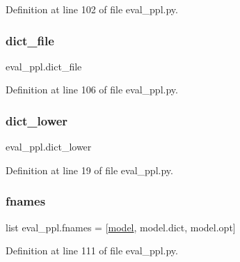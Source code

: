Definition at line 102 of file eval\+\_\+ppl.\+py.

\mbox{\label{namespaceeval__ppl_ae70a1e5d29d1562380de01b52412a9fa}} 
\subsubsection{\texorpdfstring{dict\+\_\+file}{dict\_file}}
{\footnotesize\ttfamily eval\+\_\+ppl.\+dict\+\_\+file}



Definition at line 106 of file eval\+\_\+ppl.\+py.

\mbox{\label{namespaceeval__ppl_a3c7de5b6434cc85b28eafa791111e6ae}} 
\subsubsection{\texorpdfstring{dict\+\_\+lower}{dict\_lower}}
{\footnotesize\ttfamily eval\+\_\+ppl.\+dict\+\_\+lower}



Definition at line 19 of file eval\+\_\+ppl.\+py.

\mbox{\label{namespaceeval__ppl_a21d7ad87820a8ba4905fffcc224a3395}} 
\subsubsection{\texorpdfstring{fnames}{fnames}}
{\footnotesize\ttfamily list eval\+\_\+ppl.\+fnames = \mbox{[}\textquotesingle{}\hyperlink{namespaceeval__ppl_a4d13942cad0e4fdaa614c4f31de6e865}{model}\textquotesingle{}, \textquotesingle{}model.\+dict\textquotesingle{}, \textquotesingle{}model.\+opt\textquotesingle{}\mbox{]}}



Definition at line 111 of file eval\+\_\+ppl.\+py.

\mbox{\label{namespaceeval__ppl_a4d5b66ad0d8e1b8d7db27f256eda8340}} 
